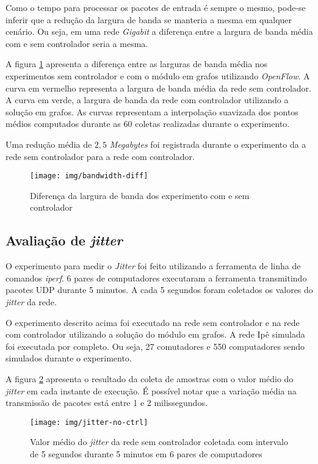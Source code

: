Como o tempo para processar os pacotes de entrada é sempre o mesmo, pode-se 
inferir que a redução da largura de banda se manteria a mesma em qualquer 
cenário.
Ou seja, em uma rede \emph{Gigabit} a diferença entre a largura de banda 
média com e sem controlador seria a mesma.

A figura \ref{fig:bandwidth-diff} apresenta a diferença entre as larguras de
banda média nos experimentos sem controlador e com o  módulo em grafos 
utilizando \emph{OpenFlow}.
A curva em vermelho representa a largura de banda média da rede sem 
controlador.
A curva em verde, a largura de banda da rede com controlador utilizando a 
solução em grafos.
As curvas representam a interpolação suavizada dos pontos médios computados
durante as 60 coletas realizadas durante o experimento.

Uma redução média de $2,5$ \emph{Megabytes} foi registrada durante o 
experimento da a rede sem controlador para a rede com controlador.

\begin{figure}[!htb]
    \centering
    \label{fig:bandwidth-diff}
    \texttt{[image: img/bandwidth-diff]}
    \caption{Diferença da largura de banda dos experimento com e sem
    controlador}
\end{figure}



\subsection{Avaliação de \emph{jitter}}

O experimento para medir o \emph{Jitter} foi feito utilizando a ferramenta 
de linha de comandos \emph{iperf}.
6 pares de computadores executaram a ferramenta transmitindo pacotes 
UDP durante 5 minutos.
A cada 5 segundos foram coletados os valores do \emph{jitter} da rede.

O experimento descrito acima foi executado na rede sem controlador e na rede
com controlador utilizando a solução do módulo em grafos.
A rede Ipê simulada foi executada por completo.
Ou seja, 27 comutadores e 550 computadores sendo simulados durante o
experimento.

A figura \ref{fig:jitter-no-ctrl} apresenta o resultado da coleta de amostras 
com o valor médio do \emph{jitter} em cada instante de execução.
É possível notar que a variação média na transmissão de pacotes está entre
1 e 2 milissegundos.

\begin{figure}[!htb]
    \centering
    \label{fig:jitter-no-ctrl}
    \texttt{[image: img/jitter-no-ctrl]}
    \caption{Valor médio do \emph{jitter} da rede sem controlador coletada com
    intervalo de 5 segundos durante 5 minutos em 6 pares de computadores}
\end{figure}

